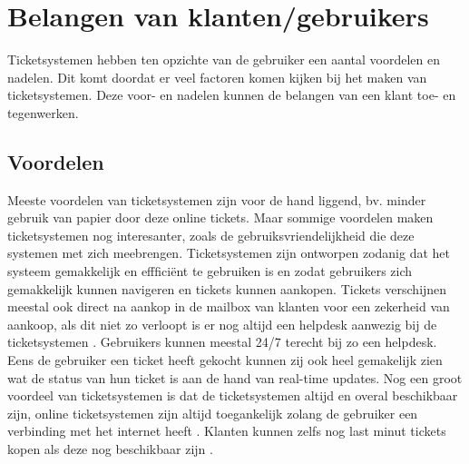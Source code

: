 
\section{Belangen van klanten/gebruikers}
Ticketsystemen hebben ten opzichte van de gebruiker een aantal voordelen en nadelen. Dit komt doordat er veel factoren komen kijken bij het maken van ticketsystemen. 
Deze voor- en nadelen kunnen de belangen van een klant toe- en tegenwerken.

\subsection{Voordelen}
Meeste voordelen van ticketsystemen zijn voor de hand liggend, bv. minder gebruik van papier door deze online tickets.
Maar sommige voordelen maken ticketsystemen nog interesanter, zoals de gebruiksvriendelijkheid die deze systemen met zich meebrengen.
Ticketsystemen zijn ontworpen zodanig dat het systeem gemakkelijk en effficiënt te gebruiken is en zodat gebruikers zich gemakkelijk kunnen navigeren en tickets kunnen aankopen.
Tickets verschijnen meestal ook direct na aankop in de mailbox van klanten voor een zekerheid van aankoop, als dit niet zo verloopt is er nog altijd een helpdesk aanwezig bij de ticketsystemen \cite{cm-voordelen}. 
Gebruikers kunnen meestal 24/7 terecht bij zo een helpdesk. Eens de gebruiker een ticket heeft gekocht kunnen zij ook heel gemakelijk zien wat de status van hun ticket is aan de hand van real-time updates.
Nog een groot voordeel van ticketsystemen is dat de ticketsystemen altijd en overal beschikbaar zijn, online ticketsystemen zijn altijd toegankelijk zolang de gebruiker een verbinding met het internet heeft \cite{Benefitsonline2023}.
Klanten kunnen zelfs nog last minut tickets kopen als deze nog beschikbaar zijn \cite{cm-voordelen}.

